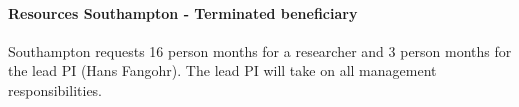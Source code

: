 %
%


\paragraph{Resources Southampton - Terminated beneficiary}

Southampton requests 16 person months for a researcher and 3 person months for the lead PI
(Hans Fangohr). The lead PI will take on all management responsibilities.

